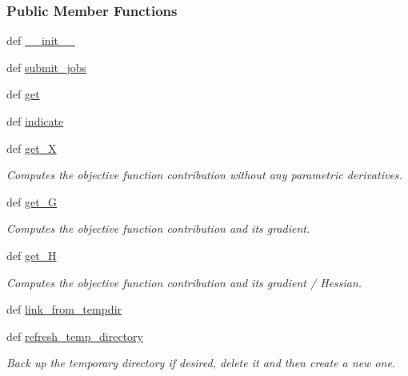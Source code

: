 \subsubsection*{Public Member Functions}
\begin{DoxyCompactItemize}
\item 
def \hyperlink{classforcebalance_1_1target_1_1RemoteTarget_ab73daaf7bc5b381fab27a795f950c73f}{\-\_\-\-\_\-init\-\_\-\-\_\-}
\item 
def \hyperlink{classforcebalance_1_1target_1_1RemoteTarget_a59354bb1a7f474e82c65cb0ef2b55098}{submit\-\_\-jobs}
\item 
def \hyperlink{classforcebalance_1_1target_1_1RemoteTarget_a7a186f5b2e135448f9249154f7da8752}{get}
\item 
def \hyperlink{classforcebalance_1_1target_1_1RemoteTarget_abbdb5171b47a8f5380bf537c809b3b1f}{indicate}
\item 
def \hyperlink{classforcebalance_1_1target_1_1Target_a606dd136f195c267c05a2455405e5949}{get\-\_\-\-X}
\begin{DoxyCompactList}\small\item\em Computes the objective function contribution without any parametric derivatives. \end{DoxyCompactList}\item 
def \hyperlink{classforcebalance_1_1target_1_1Target_afa8cc38c8bba8861c072e789717aa049}{get\-\_\-\-G}
\begin{DoxyCompactList}\small\item\em Computes the objective function contribution and its gradient. \end{DoxyCompactList}\item 
def \hyperlink{classforcebalance_1_1target_1_1Target_a1d2ee27fe86a09769c1816af23b09adb}{get\-\_\-\-H}
\begin{DoxyCompactList}\small\item\em Computes the objective function contribution and its gradient / Hessian. \end{DoxyCompactList}\item 
def \hyperlink{classforcebalance_1_1target_1_1Target_a5aa4958cea0a48138511567a076c5a82}{link\-\_\-from\-\_\-tempdir}
\item 
def \hyperlink{classforcebalance_1_1target_1_1Target_afe815eafab06ac92f10bbf4b88ad95c8}{refresh\-\_\-temp\-\_\-directory}
\begin{DoxyCompactList}\small\item\em Back up the temporary directory if desired, delete it and then create a new one. \end{DoxyCompactList}\item 

\end{DoxyCompactItemize}
